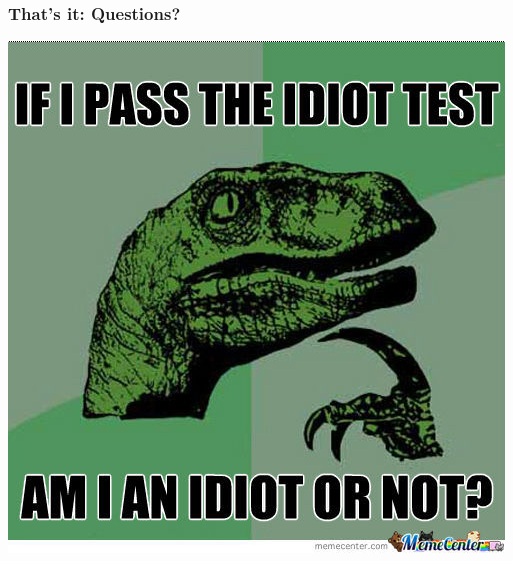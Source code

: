 \documentclass{beamer}
\begin{document}
\begin{frame}
\frametitle{That's it: Questions?}
\begin{center}
\includegraphics[width=.6\textwidth]{../img/idiot_test}
\end{center}
\end{frame}

\end{document}
